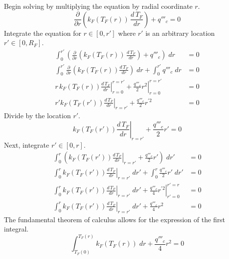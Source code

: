       Begin solving  by multiplying the
      equation by radial coordinate $r$.
      \begin{equation}
        \frac{\partial}{\partial r} \left( k_F(T_F(r)) \, \frac{d\, T_F}{dr} 
        \right) + q'''_c = 0
      \end{equation}
      Integrate the equation for $r \in [0,r']$ where $r'$ is an arbitrary
      location $r' \in [0,R_F]$.
      \begin{align}
        \int_0^{r'} \left( \frac{\partial}{\partial r} \left( k_F(T_F(r)) \, 
          \frac{d\, T_F}{dr} \right) + q'''_c \right) \; dr &= 0 \\
        \int_0^{r'} \frac{\partial}{\partial r} \left( k_F(T_F(r)) 
          \frac{d \, T_F}{dr} \right) \; dr + \int_0^{r'} q'''_c \; dr &= 0 \\
        \left. r \, k_F(T_F(r)) \frac{d\,T_F}{dr} \right|_{r=0}^{r=r'} + 
          \left. \frac{q'''_c}{2} r^2 \right|_{r=0}^{r=r'} &= 0 \\
        \label{eq:dtdr_fuel}
        \left. r' k_F(T_F(r')) \frac{d\,T_F}{dr} \right|_{r=r'} + 
          \frac{q'''_c}{2} r^{\prime 2} &= 0
      \end{align}
      Divide by the location $r'$.
      \begin{equation}
        \left. k_F(T_F(r')) \frac{d \, T_F}{dr}\right|_{r=r'} + 
          \frac{q'''_c}{2} r' = 0
      \end{equation}
      Next, integrate $r' \in [0,r]$.
      \begin{align}
        \int_0^r \left( k_F(T_F(r')) \left. \frac{d\,T_F}{dr}\right|_{r=r'} 
          + \frac{q'''_c}{2} r' \right) \; dr' &= 0 \\
        \int_0^r k_F(T_F(r')) \left. \frac{d\,T_F}{dr}\right|_{r=r'} \; dr' + 
          \int_0^r \frac{q'''_c}{2} r' \; dr' &= 0 \\
        \int_0^r k_F(T_F(r')) \left. \frac{d\,T_F}{dr}\right|_{r=r'} \; dr' + 
          \left. \frac{q'''_c}{4} r^{\prime 2} \right|_{r'=0}^{r'=r} &= 0 \\
        \int_0^r k_F(T_F(r')) \left. \frac{d\,T_F}{dr}\right|_{r=r'} \; dr' + 
          \frac{q'''_c}{4} r^2 &= 0
      \end{align}
      The fundamental theorem of calculus allows for the expression of the first
      integral.
      \begin{equation}
        \label{eq:tcl_integral}
        \int_{T_F(0)}^{T_F(r)} k_F(T_F(r)) \; dr + \frac{q'''_c}{4} r^2 = 0
      \end{equation}
